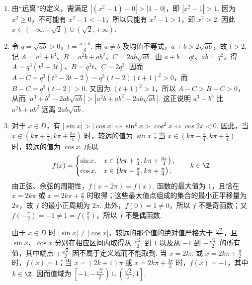 \begin{solution}
\begin{enumerate}
\item 由“远离”的定义，需满足 \(\left|(x^2-1)-0\right|>|1-0|\)，即 \(\left|x^2-1\right|>1\). 因为 \(x^2\geqslant0\)，不可能有 \(x^2-1<-1\)，所以只能有 \(x^2-1>1\)，即 \(x^2>2\). 因此 \(x\in(-\infty,-\sqrt{2})\cup(\sqrt{2},+\infty)\).

\item 令 \(q=\sqrt{ab}>0\)，\(t=\frac{a+b}{q}\). 由 \(a\neq b\) 及均值不等式，\(a+b>2\sqrt{ab}\)，故 \(t>2\). 记 \(A=a^3+b^3\)、\(B=a^2b+ab^2\)、\(C=2ab\sqrt{ab}\). 由 \(a+b=qt\)、\(ab=q^2\)，得 \(A=q^3(t^3-3t)\)、\(B=q^3t\)、\(C=2q^3\). 因而 \(A-C=q^3(t^3-3t-2)=q^3(t-2)(t+1)^2>0\)，而 \(B-C=q^3(t-2)>0\). 又因为 \((t+1)^2>1\)，所以 \(A-C>B-C>0\)，从而
\(\left|a^3+b^3-2ab\sqrt{ab}\right|>\left|a^2b+ab^2-2ab\sqrt{ab}\right|\). 这正说明 \(a^3+b^3\) 比 \(a^2b+ab^2\) 远离 \(2ab\sqrt{ab}\).

\item 对于 \(x\in D\)，有 \(\left|\sin x\right|>\left|\cos x\right|\iff\sin^2x>\cos^2x\iff\cos2x<0\). 因此，当 \(x\in\left(k\pi+\frac{\pi}{4},k\pi+\frac{3\pi}{4}\right)\) 时，较远的值为 \(\sin x\)；当 \(x\in\left(k\pi-\frac{\pi}{4},k\pi+\frac{\pi}{4}\right)\) 时，较远的值为 \(\cos x\). 所以
\[
f(x)=
\begin{cases}
\sin x,&x\in\left(k\pi+\frac{\pi}{4},k\pi+\frac{3\pi}{4}\right),\\
\cos x,&x\in\left(k\pi-\frac{\pi}{4},k\pi+\frac{\pi}{4}\right),
\end{cases}
\qquad k\in\Z
\]
由正弦、余弦的周期性，\(f(x+2\pi)=f(x)\). 函数的最大值为 \(1\)，且恰在 \(x=2k\pi\) 或 \(x=2k\pi+\frac{\pi}{2}\) 时取得；这些最大值点组成的集合的最小正平移量为 \(2\pi\)，故 \(f\) 的最小正周期为 \(2\pi\). 此外，\(f(0)=1\neq0\)，所以 \(f\) 不是奇函数；又 \(f\left(-\frac{\pi}{2}\right)=-1\neq1=f\left(\frac{\pi}{2}\right)\)，所以 \(f\) 不是偶函数.

由于 \(x\in D\) 时 \(|\sin x|\neq|\cos x|\)，较远的那个值的绝对值严格大于 \(\frac{\sqrt{2}}{2}\)，且 \(\sin x\)、\(\cos x\) 分别在相应区间内取得从 \(\frac{\sqrt{2}}{2}\) 到 \(1\) 以及从 \(-1\) 到 \(-\frac{\sqrt{2}}{2}\) 的所有值，其中端点 \(\pm\frac{\sqrt{2}}{2}\) 因不属于定义域而不能取到. 当 \(x=2k\pi\) 或 \(x=2k\pi+\frac{\pi}{2}\) 时，\(f(x)=1\)；当 \(x=(2k+1)\pi\) 或 \(x=2k\pi+\frac{3\pi}{2}\) 时，\(f(x)=-1\)，其中 \(k\in\Z\). 因而值域为 \(\left[-1,-\frac{\sqrt{2}}{2}\right)\cup\left(\frac{\sqrt{2}}{2},1\right]\).


\end{enumerate}
\end{solution}
